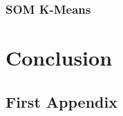 \documentclass{l4proj}
\begin{document}
\subsection{SOM K-Means}



\chapter{Conclusion}
\label{conclusion}







\begin{appendices}

\chapter{First Appendix}

\end{appendices}
\end{document}
